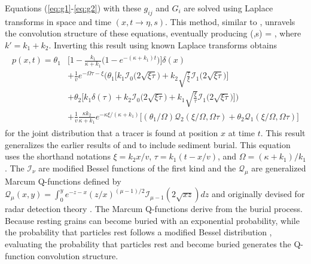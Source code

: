 Equations (\ref{eq:g1}-\ref{eq:g2}) with these $g_{ij}$ and $G_i$ are solved using Laplace transforms in space and time $(x,t \rightarrow 
\eta,s).$ This method, similar to \citet{Weeks1998}, unravels the convolution structure of these equations, eventually producing
\be {}(\eta,s) = , \label{eq:diffnicedist}\ee
where $k' = k_1 + k_2$. Inverting this result using known Laplace transforms \citep{Prudnikov1992a,Arfken1985} obtains
\begin{align}
	\begin{split}
		p(x,t) = \theta_1&\Big[1-\frac{k_1}{\kappa+k_1}\Big(1-e^{-(\kappa+k_1)t}\Big)\Big]\delta(x) \\ &+ \frac{1}{v}e^{-\Omega \tau - \xi}\Big(\theta_1\Big[k_1\mathcal{I}_0\big(2\sqrt{\xi\tau}\big) + k_2\sqrt{\frac{\tau}{\xi}}\mathcal{I}_1\big(2\sqrt{\xi\tau}\big)\Big] \\ 
		&+ \theta_2\Big[k_1\delta(\tau) + k_2 \mathcal{I}_0\big(2\sqrt{\xi\tau}\big)+k_1 \sqrt{\frac{\xi}{\tau}}\mathcal{I}_1\big(2\sqrt{\xi\tau}\big)\Big]\Big) \\
		&+ \frac{1}{v}\frac{\kappa k_2}{\kappa + k_1}e^{-\kappa \xi/(\kappa + k_1)}\Big[(\theta_1/\Omega)\mathcal{Q}_2(\xi/\Omega,\Omega\tau) + \theta_2 \mathcal{Q}_1(\xi/\Omega,\Omega\tau)\Big]
		\label{eq:pdf}
	\end{split}
\end{align}
for the joint distribution that a tracer is found at position $x$ at time $t$.
This result generalizes the earlier results of \citet{Lisle1998} and \citet{Einstein1937} to include sediment burial.
This equation uses the shorthand notations $\xi = k_2 x/v$, $\tau = k_1(t-x/v)$, and $\Omega = (\kappa+k_1)/k_1$ \citep[c.f.][]{Lisle1998}. The $\mathcal{I}_\nu$ are modified Bessel functions of the first kind and the $\mathcal{Q}_\mu$ are generalized Marcum Q-functions defined by $\mathcal{Q}_\mu(x,y) = \int_0^y e^{-z-x}(z/x)^{(\mu-1)/2}\mathcal{I}_{\mu-1}(2\sqrt{xz})dz $ and originally devised for radar detection theory \citep{Marcum1960,Temme1996}. 
The Marcum Q-functions derive from the burial process.
Because resting grains can become buried with an exponential probability, while the probability that particles rest follows a modified Bessel distribution \citep{Einstein1937,Lisle1998}, evaluating the probability that particles rest and become buried generates the Q-function convolution structure. 

